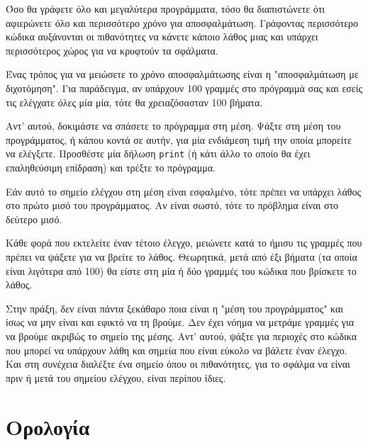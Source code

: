 \documentclass[10pt]{book}
\begin{document}
Όσο θα γράφετε όλο και μεγαλύτερα προγράμματα, τόσο θα διαπιστώνετε ότι αφιερώνετε όλο και περισσότερο χρόνο για αποσφαλμάτωση. Γράφοντας περισσότερο κώδικα αυξάνονται οι πιθανότητες να κάνετε κάποιο λάθος μιας και υπάρχει περισσότερος χώρος για να κρυφτούν τα σφάλματα.

Ένας τρόπος για να μειώσετε το χρόνο αποσφαλμάτωσης είναι η "αποσφαλμάτωση με
διχοτόμηση". Για παράδειγμα, αν υπάρχουν 100 γραμμές στο πρόγραμμά σας και εσείς τις ελέγχατε όλες μία μία, τότε θα χρειαζόσασταν 100 βήματα.

Αντ' αυτού, δοκιμάστε να σπάσετε το πρόγραμμα στη μέση. Ψάξτε στη μέση του προγράμματος, ή κάπου κοντά σε αυτήν, για μία ενδιάμεση τιμή την οποία μπορείτε να ελέγξετε. Προσθέστε μία δήλωση {\tt print} (ή κάτι άλλο το οποίο θα έχει επαληθεύσιμη επίδραση) και τρέξτε το πρόγραμμα.

Εάν αυτό το σημείο ελέγχου στη μέση είναι εσφαλμένο, τότε πρέπει να υπάρχει λάθος στο πρώτο μισό του προγράμματος. Αν είναι σωστό, τότε το πρόβλημα είναι στο δεύτερο μισό.

Κάθε φορά που εκτελείτε έναν τέτοιο έλεγχο, μειώνετε κατά το ήμισυ τις γραμμές που πρέπει να ψάξετε για να βρείτε το λάθος. Θεωρητικά, μετά από έξι βήματα (τα οποία είναι λιγότερα από 100) θα είστε στη μία ή δύο γραμμές του κώδικα που βρίσκετε το λάθος.

Στην πράξη, δεν είναι πάντα ξεκάθαρο ποια είναι η "μέση του προγράμματος" και ίσως να μην είναι και εφικτό να τη βρούμε. Δεν έχει νόημα να μετράμε γραμμές για να βρούμε ακριβώς το σημείο της μέσης. Αντ' αυτού, ψάξτε για περιοχές στο κώδικα που μπορεί να υπάρχουν λάθη και σημεία που είναι εύκολο να βάλετε έναν έλεγχο. Και στη συνέχεια διαλέξτε ένα σημείο όπου οι πιθανότητες, για
το σφάλμα να είναι πριν ή μετά του σημείου ελέγχου, είναι περίπου ίδιες.




\section{Ορολογία}
\end{document}
